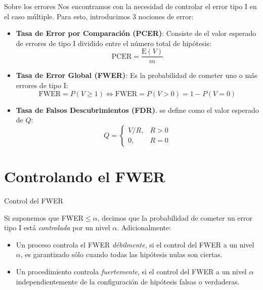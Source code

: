 \begin{frame}{Sobre los errores}
Nos encontramos con la necesidad de controlar el error tipo I en el caso múltiple. Para esto, introducimos 3 nociones de error:
\begin{itemize} [<+- | alert@+>]
	\item \textbf{Tasa de Error por Comparación (PCER)}: Consiste de el valor esperado de errores de tipo I dividido entre el número total de hipótesis:
$$
\mathrm{PCER}=\frac{\mathrm{E}(V) }{m}
$$
    \item \textbf{Tasa de Error Global (FWER)}: Es la probabilidad de cometer uno o más errores de tipo I:
$$
\mathrm{FWER}=P(V \geq 1) \Longleftrightarrow \mathrm{FWER}=P(V>0)=1-P(V=0)
$$
\item \textbf{Tasa de Falsos Descubrimientos (FDR)}. se define como el valor esperado de $Q$:
$$
Q=\left\{\begin{array}{ll}
	V/R, & R>0 \\
	0, & R=0
\end{array}\right.
$$
\end{itemize}
\end{frame}

\section{Controlando el FWER}

\begin{frame}{Control del FWER}
\begin{df}
Si suponemos que FWER$\leq\alpha$, decimos que 	la probabilidad de cometer un error tipo I está \textit{controlada} por un nivel $\alpha$. Adicionalmente:
\begin{itemize}
    \item Un proceso controla el FWER \textit{débilmente}, si el control del FWER a un nivel $\alpha$, es garantizado sólo cuando todas las hipótesis  nulas son ciertas.
    \item Un procedimiento controla \textit{fuertemente}, si el control del FWER a un nivel $\alpha$ independientemente de la configuración de hipótesis falsas o verdaderas.
\end{itemize}
\end{df}
\end{frame}


